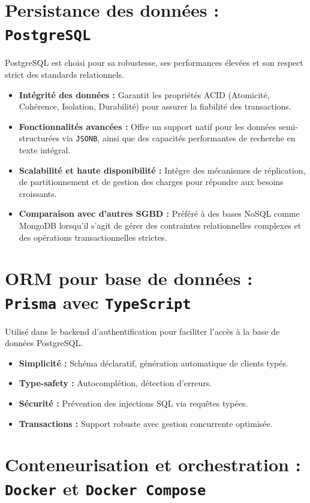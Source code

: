 \documentclass[12pt]{rapportPfe}
\begin{document}
\section{Persistance des données : \texttt{PostgreSQL}}

PostgreSQL est choisi pour sa robustesse, ses performances élevées et son respect strict des standards relationnels.

\begin{itemize}
    \item \textbf{Intégrité des données :} Garantit les propriétés ACID (Atomicité, Cohérence, Isolation, Durabilité) pour assurer la fiabilité des transactions.
    \item \textbf{Fonctionnalités avancées :} Offre un support natif pour les données semi-structurées via \texttt{JSONB}, ainsi que des capacités performantes de recherche en texte intégral.
    \item \textbf{Scalabilité et haute disponibilité :} Intègre des mécanismes de réplication, de partitionnement et de gestion des charges pour répondre aux besoins croissants.
    \item \textbf{Comparaison avec d’autres SGBD :} Préféré à des bases NoSQL comme MongoDB lorsqu’il s’agit de gérer des contraintes relationnelles complexes et des opérations transactionnelles strictes.
\end{itemize}

\section{ORM pour base de données : \texttt{Prisma} avec \texttt{TypeScript}}

Utilisé dans le backend d’authentification pour faciliter l’accès à la base de données PostgreSQL.

\begin{itemize}
    \item \textbf{Simplicité :} Schéma déclaratif, génération automatique de clients typés.
    \item \textbf{Type-safety :} Autocomplétion, détection d’erreurs.
    \item \textbf{Sécurité :} Prévention des injections SQL via requêtes typées.
    \item \textbf{Transactions :} Support robuste avec gestion concurrente optimisée.
\end{itemize}

\section{Conteneurisation et orchestration : \texttt{Docker} et \texttt{Docker Compose}}
\end{document}
